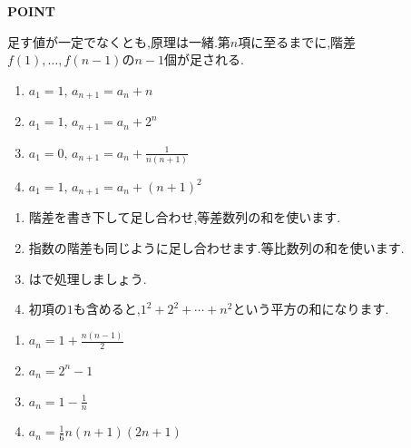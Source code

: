     \begin{bookpoint}
      \textbf{POINT}\par
      足す値が一定でなくとも,原理は一緒.第$n$項に至るまでに,階差$f(1),\ldots,f(n-1)$の$n-1$個が足される.
    \end{bookpoint}
    
  \noindent {}\par\nobreak
  \begin{enumerate}[label=(\arabic*),parsep=3pt,format=\bookitemlink{example-difference-1}{problem}{hint}]
    \item $a_1=1,\, a_{n+1}=a_n+n$
    \item $a_1=1,\, a_{n+1}=a_n+2^n$
    \item $a_1=0,\, a_{n+1}=a_n+\frac{1}{n(n+1)}$
    \item $a_1=1,\, a_{n+1}=a_n+(n+1)^2$
  \end{enumerate}
  
  \noindent{}\par\nobreak
  \begin{enumerate}[label=(\arabic*),parsep=3pt,format=\bookitemlink{example-difference-1}{hint}{answer}]
    \item 階差を書き下して足し合わせ,等差数列の和を使います.
    \item 指数の階差も同じように足し合わせます.等比数列の和を使います.
    \item {}はで処理しましょう.
    \item 初項の$1$も含めると,$1^2+2^2+\cdots+n^2$という平方の和になります.
  \end{enumerate}
  
  \noindent{}\par\nobreak
  \begin{enumerate}[label=(\arabic*),parsep=3pt,format=\bookitemlink{example-difference-1}{answer}{solution}]
    \item $a_n=1+\frac{n(n-1)}{2}$
    \item $a_n=2^n-1$
    \item $a_n=1-\frac{1}{n}$
    \item $a_n=\frac{1}{6}n(n+1)(2n+1)$
  \end{enumerate}
  
